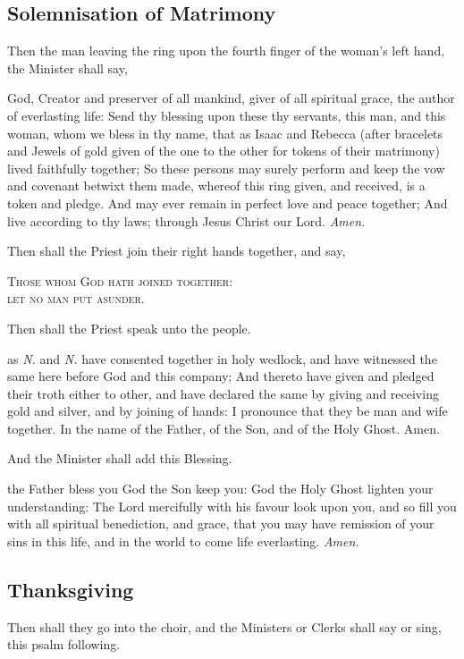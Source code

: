 \subsection{Solemnisation of Matrimony}
\begin{rubric}
	Then the man leaving the ring upon the fourth finger of the woman's left hand, the Minister shall say,
\end{rubric}
{} God, Creator and preserver of all mankind, giver of all spiritual grace, the author of everlasting life: Send thy blessing upon these thy servants, this man, and this woman, whom we bless in thy name, that as Isaac and Rebecca (after bracelets and Jewels of gold given of the one to the other for tokens of their matrimony) lived faithfully together; So these persons may surely perform and keep the vow and covenant betwixt them made, whereof this ring given, and received, is a token and pledge. And may ever remain in perfect love and peace together; And live according to thy laws; through Jesus Christ our Lord. \textit{Amen.}
\begin{rubric}
	Then shall the Priest join their right hands together, and say,
\end{rubric}
\begin{center}
    \textsc{Those whom God hath joined together:\\let no man put asunder.}
\end{center}
\begin{rubric}
	Then shall the Priest speak unto the people.
\end{rubric}
 as \textit{N.} and \textit{N.} have consented together in holy wedlock, and have witnessed the same here before God and this company; And thereto have given and pledged their troth either to other, and have declared the same by giving and receiving gold and silver, and by joining of hands: I pronounce that they be man and wife together. In the name of the Father, of the Son, and of the Holy Ghost. Amen.
\begin{rubric}
	And the Minister shall add this Blessing.
\end{rubric}
 the Father bless you {} God the Son keep you: God the Holy Ghost lighten your understanding: The Lord mercifully with his favour look upon you, and so fill you with all spiritual benediction, and grace, that you may have remission of your sins in this life, and in the world to come life everlasting. \textit{Amen.}
\subsection{Thanksgiving}
\begin{rubric}
	Then shall they go into the choir, and the Ministers or Clerks shall say or sing, this psalm following.
\end{rubric}
